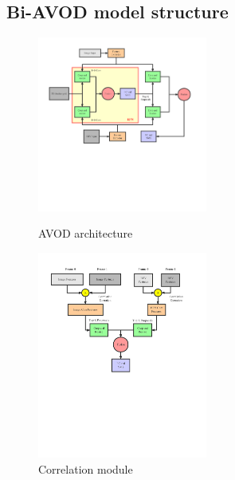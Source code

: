 \documentclass{bmvc2k}
\begin{document}
\subsection{Bi-AVOD model structure}

\begin{figure}
	\setlength{\abovecaptionskip}{-0.5cm}
	\begin{minipage}[t]{0.5\linewidth}
		\centering
		\includegraphics[trim={0cm, 8cm, 2cm, 0cm}, clip, width=2.2in]{images/AVOD.pdf}
		\caption{AVOD architecture}
		\label{fig:avod}
	\end{minipage}%
	\begin{minipage}[t]{0.5\linewidth}
		\centering
		\includegraphics[trim={0cm, 9cm, 2cm, 0cm}, clip, width=2.2in]{images/Correlation.pdf}
		\caption{Correlation module}
		\label{fig:correlation}
	\end{minipage}
\end{figure}
\end{document}
